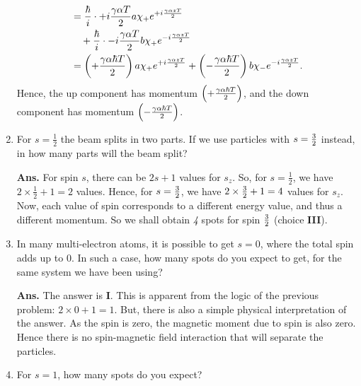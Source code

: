 \documentclass[12pt]{article}
\newcommand\half{\frac{1}{2}}
\newcommand\tbf[1]{\textbf{#1}}
\newcommand\tans{\tbf{Ans. }}
\newcommand\vs[1]{\vspace{#1}}
\begin{document}
\begin{enumerate}[\bf 1.]
$$\begin{aligned}
					&= \frac{\hbar}{i}\cdot{+i{{\gamma \alpha T}\over{2}}} a \chi_+ e ^ {+i{{\gamma \alpha z T}\over{2}}} \\
					& \quad + \frac{\hbar}{i}\cdot{-i{{\gamma \alpha T}\over{2}}} b \chi_+ e ^ {-i{{\gamma \alpha z T}\over{2}}} \\
					&= \left( + {\gamma \alpha \hbar T \over 2} \right) a \chi_+ e ^ {+i{{\gamma \alpha z T}\over{2}}} + \left( - {\gamma \alpha \hbar T \over 2} \right) b \chi_- e ^ {-i{{\gamma \alpha z T}\over{2}}}.
\end{aligned}
$$
Hence, the up component has momentum $\left( + {\gamma \alpha \hbar T \over 2} \right)$, and the down component has momentum $\left( - {\gamma \alpha \hbar T \over 2} \right)$. 
\item For $s=\half$ the beam splits in two parts. If we use particles with $s={3\over 2}$ instead, in how many parts will the beam split?
\vs{0.5cm}
\tans For spin $s$, there can be $2s+1$ values for $s_z$. So, for $s=\half$, we have $2\times\half + 1=2$ values. Hence, for $s={3\over 2}$, we have $2\times{3\over 2} + 1=4$ values for $s_z$. Now, each value of spin corresponds to a different energy value, and thus a different momentum. So we shall obtain {\it 4} spots for spin ${3\over 2}$ (choice {\bf III}).
\vs{1cm}
\item In many multi-electron atoms, it is possible to get $s=0$, where the total spin adds up to $0$. In such a case, how many spots do you expect to get, for the same system we have been using?
\vs{0.5cm}
\tans The answer is {\bf I}. This is apparent from the logic of the previous problem: $2\times 0 + 1 = 1$. But, there is also a simple physical interpretation of the answer. As the spin is zero, the magnetic moment due to spin is also zero. Hence there is no spin-magnetic field interaction that will separate the particles.
\vs{1cm}
\item For $s=1$, how many spots do you expect?

\end{enumerate}
\end{document}
